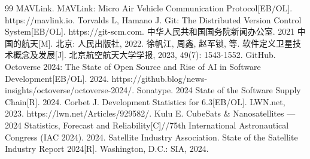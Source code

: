 \documentclass[UTF8,a4paper,zihao=-4]{ctexart}
\begin{document}
\begin{thebibliography}{99}
 MAVLink. MAVLink: Micro Air Vehicle Communication Protocol[EB/OL]. https://mavlink.io.
 Torvalds L, Hamano J. Git: The Distributed Version Control System[EB/OL]. https://git-scm.com.
 中华人民共和国国务院新闻办公室. 2021 中国的航天[M]. 北京: 人民出版社, 2022.
 徐帆江, 周鑫, 赵军锁, 等. 软件定义卫星技术概念及发展[J]. 北京航空航天大学学报, 2023, 49(7): 1543-1552.
 GitHub. Octoverse 2024: The State of Open Source and Rise of AI in Software Development[EB/OL]. 2024. https://github.blog/news-insights/octoverse/octoverse-2024/.
 Sonatype. 2024 State of the Software Supply Chain[R]. 2024.
 Corbet J. Development Statistics for 6.3[EB/OL]. LWN.net, 2023. https://lwn.net/Articles/929582/.
 Kulu E. CubeSats \& Nanosatellites --- 2024 Statistics, Forecast and Reliability[C]//75th International Astronautical Congress (IAC 2024). 2024.
 Satellite Industry Association. State of the Satellite Industry Report 2024[R]. Washington, D.C.: SIA, 2024.
\end{thebibliography}
\end{document}
